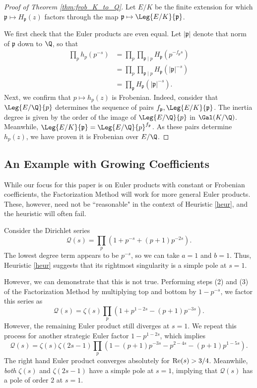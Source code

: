 \documentclass[12pt]{amsart}
\newenvironment{BOXexample}{
\begin{exbox}\mbox{}
\begin{example}
}
{
\end{example}
\end{exbox}
}
\theoremstyle{plain}
\begin{document}
\begin{proof}[Proof of Theorem \ref{thm:frob_K_to_Q}]
Let $E/K$ be the finite extension for which $\mathfrak{p}\mapsto H_{\mathfrak{p}}(z)$ factors through the map $\mathfrak{p} \mapsto \Leg{E/K}{\mathfrak{p}}$.

We first check that the Euler products are even equal. Let $|\mathfrak{p}|$ denote that norm of $\mathfrak{p}$ down to $\Q$, so that
\begin{align*}
    \prod_p h_p(p^{-s}) &= \prod_p \prod_{\mathfrak{p}\mid p}H_\mathfrak{p}(p^{-f_{\mathfrak{p}}s})\\
    &= \prod_p \prod_{\mathfrak{p}\mid p}H_\mathfrak{p}(|\mathfrak{p}|^{-s})\\
    &=\prod_{\mathfrak{p}}H_\mathfrak{p}(|\mathfrak{p}|^{-s}).
\end{align*}
Next, we confirm that $p\mapsto h_p(z)$ is Frobenian. Indeed, consider that $\Leg{E/\Q}{p}$ determines the sequence of pairs $f_{\mathfrak{p}}, \Leg{E/K}{\mathfrak{p}}$. The inertia degree is given by the order of the image of $\Leg{E/\Q}{p}$ in $\Gal(K/\Q)$. Meanwhile, $\Leg{E/K}{\mathfrak{p}} = \Leg{E/\Q}{p}^{f_{\mathfrak{p}}}$. As these pairs determine $h_p(z)$, we have proven it is Frobenian over $E/\Q$.
\end{proof}





\subsection{An Example with Growing Coefficients}
While our focus for this paper is on Euler products with constant or Frobenian coefficients, the Factorization Method will work for more general Euler products. These, however, need not be ``reasonable" in the context of Heuristic \ref{heur}, and the heuristic will often fail.

\begin{BOXexample}\label{ex:growing_coef}
Consider the Dirichlet series
\[
\mathcal{Q}(s) = \prod_p (1 + p^{-s} + (p+1)p^{-2s}).
\]
The lowest degree term appears to be $p^{-s}$, so we can take $a=1$ and $b=1$. Thus, Heuristic \ref{heur} suggests that its rightmost singularity is a simple pole at $s=1$.

However, we can demonstrate that this is not true. Performing steps (2) and (3) of the Factorization Method by multiplying top and bottom by $1-p^{-s}$, we factor this series as
\[
\mathcal{Q}(s) = \zeta(s) \prod_p (1 + p^{1-2s} - (p+1)p^{-3s}).
\]
However, the remaining Euler product still diverges at $s=1$. We repeat this process for another strategic Euler factor $1-p^{1-2s}$, which implies
\[
\mathcal{Q}(s) = \zeta(s)\zeta(2s-1)\prod_p (1 - (p+1)p^{-3s}- p^{2-4s} - (p+1)p^{1-5s}).
\]
The right hand Euler product converges absolutely for ${\rm Re}(s) > 3/4$. Meanwhile, \emph{both} $\zeta(s)$ and $\zeta(2s-1)$ have a simple pole at $s=1$, implying that $\mathcal{Q}(s)$ has a pole of order $2$ at $s=1$.
\end{BOXexample}
\end{document}
